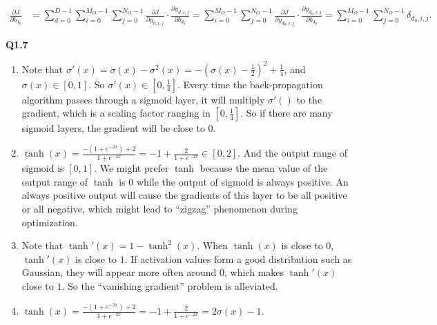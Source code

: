 \documentclass[
  course = {{16-720B Computer Vision}},
  quartile = {{1}},
  assignment = 3-Neural\ Networks\ for\ Recognition,
  name = {{Kangle Deng}},
  email = {{kangled@andrew.cmu.edu}},
  firstexercise = 1
]{aga-homework}
\begin{document}
\begin{equation*}
    \begin{aligned}
        \frac{\partial J}{\partial b_{d_0}} & = \sum \limits_{d=0}^{D-1} \sum \limits_{i=0}^{M_O-1} \sum \limits_{j=0}^{N_O-1} \frac{\partial J}{\partial y_{d,i,j}} \cdot \frac{\partial y_{d,i,j}}{\partial b_{d_0}} = \sum \limits_{i=0}^{M_O-1} \sum \limits_{j=0}^{N_O-1} \frac{\partial J}{\partial y_{d_0,i,j}} \cdot \frac{\partial y_{d_0,i,j}}{\partial b_{d_0}} = \sum \limits_{i=0}^{M_O-1} \sum \limits_{j=0}^{N_O-1} \delta_{d_0,i,j}.
    \end{aligned}
\end{equation*}

\noindent \textbf{Q1.7}

\begin{enumerate}
    \item Note that $\sigma'(x) = \sigma(x) - \sigma^2(x) = -(\sigma(x)-\frac{1}{2})^2+\frac{1}{4}$, and $\sigma(x) \in [0, 1]$. So $\sigma'(x) \in [0, \frac{1}{4}]$. Every time the back-propagation algorithm passes through a sigmoid layer, it will multiply $\sigma'()$ to the gradient, which is a scaling factor ranging in $[0,\frac{1}{4}]$. %
    So if there are many sigmoid layers, the gradient will be close to $0$.
    \item $\tanh{(x)} = \frac{-(1+e^{-2x})+2}{1+e^{-2x}} = -1 + \frac{2}{1+e^{-2x}} \in [0, 2]$. And the output range of sigmoid is $[0,1]$. We might prefer $\tanh$ because the mean value of the output range of $\tanh$ is 0 while the output of sigmoid is always positive. An always positive output will cause the gradients of this layer to be all positive or all negative, which might lead to ``zigzag'' phenomenon during optimization.
    \item Note that $\tanh'(x) = 1 - \tanh^2(x)$. When $\tanh(x)$ is close to $0$, $\tanh'(x)$ is close to $1$. If activation values form a good distribution such as Gaussian, they will appear more often around $0$, which makes $\tanh'(x)$ close to $1$. So the ``vanishing gradient'' problem is alleviated.
    \item $\tanh(x) = \frac{-(1+e^{-2x})+2}{1+e^{-2x}} = -1 + \frac{2}{1+e^{-2x}} = 2\sigma(x) - 1$.
\end{enumerate}
\end{document}
